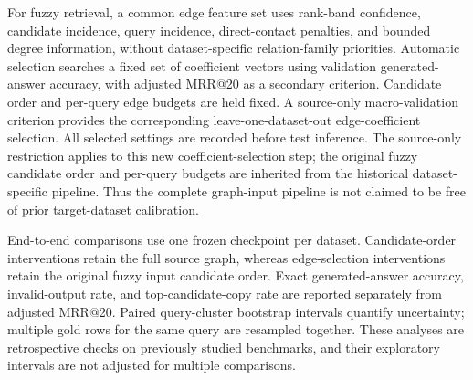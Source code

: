 For fuzzy retrieval, a common edge feature set uses rank-band confidence,
candidate incidence, query incidence, direct-contact penalties, and bounded
degree information, without dataset-specific relation-family priorities.
Automatic selection searches a fixed set of coefficient vectors using validation
generated-answer accuracy, with adjusted MRR@20 as a secondary criterion. Candidate
order and per-query edge budgets are held fixed. A source-only macro-validation
criterion provides the corresponding leave-one-dataset-out edge-coefficient
selection. All selected settings are recorded before test inference.
The source-only restriction applies to this new coefficient-selection step;
the original fuzzy candidate order and per-query budgets are inherited from the
historical dataset-specific pipeline. Thus the complete graph-input pipeline is
not claimed to be free of prior target-dataset calibration.

End-to-end comparisons use one frozen checkpoint per dataset. Candidate-order
interventions retain the full source graph, whereas edge-selection interventions
retain the original fuzzy input candidate order. Exact generated-answer accuracy,
invalid-output rate, and top-candidate-copy rate are reported separately from
adjusted MRR@20. Paired query-cluster bootstrap intervals quantify uncertainty;
multiple gold rows for the same query are resampled together. These analyses are
retrospective checks on previously studied benchmarks, and their exploratory
intervals are not adjusted for multiple comparisons.
